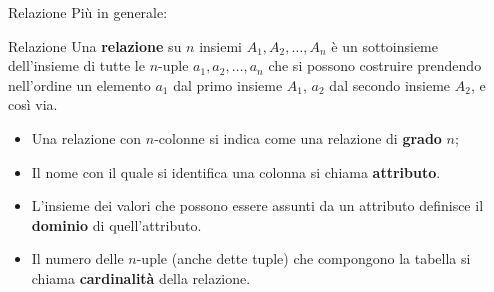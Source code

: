%
\begin{frame}{Relazione}
Pi\`u in generale:
\begin{block}{Relazione}
Una \textbf{relazione} su $n$ insiemi $A_1, A_2, \ldots, A_n$ \`e un sottoinsieme dell'insieme di tutte le $n$-uple $a_1, a_2, \ldots, a_n$ che si possono costruire prendendo nell'ordine un elemento $a_1$ dal primo insieme $A_1$, $a_2$ dal secondo insieme $A_2$, e cos\`i via.
\pause
\begin{itemize}[<+->]
    \item Una relazione con $n$-colonne si indica come una relazione di \textbf{grado} $n$;
    \item Il nome con il quale si identifica una colonna si chiama \textbf{attributo}.
    \item L'insieme dei valori che possono essere assunti da un attributo definisce il \textbf{dominio} di quell'attributo.
    \item Il numero delle $n$-uple (anche dette tuple) che compongono la tabella si chiama \textbf{cardinalit\`a} della relazione.
\end{itemize}
\end{block}
\end{frame}
%
